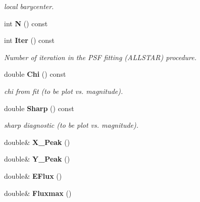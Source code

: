 \begin{CompactItemize}
\begin{CompactList}\small\item\em local barycenter.\item\end{CompactList}\item 
{}
int {\bf N} () const\label{class_sestar_a39}

\item 
{}
int {\bf Iter} () const\label{class_sestar_a40}

\begin{CompactList}\small\item\em Number of iteration in the PSF fitting (ALLSTAR) procedure.\item\end{CompactList}\item 
{}
double {\bf Chi} () const\label{class_sestar_a41}

\begin{CompactList}\small\item\em chi from fit (to be plot vs. magnitude).\item\end{CompactList}\item 
{}
double {\bf Sharp} () const\label{class_sestar_a42}

\begin{CompactList}\small\item\em sharp diagnostic (to be plot vs. magnitude).\item\end{CompactList}\item 
{}
double\& {\bf X\_\-Peak} ()\label{class_sestar_a43}

\item 
{}
double\& {\bf Y\_\-Peak} ()\label{class_sestar_a44}

\item 
{}
double\& {\bf EFlux} ()\label{class_sestar_a45}

\item 
{}
double\& {\bf Fluxmax} ()\label{class_sestar_a46}


\end{CompactItemize}

